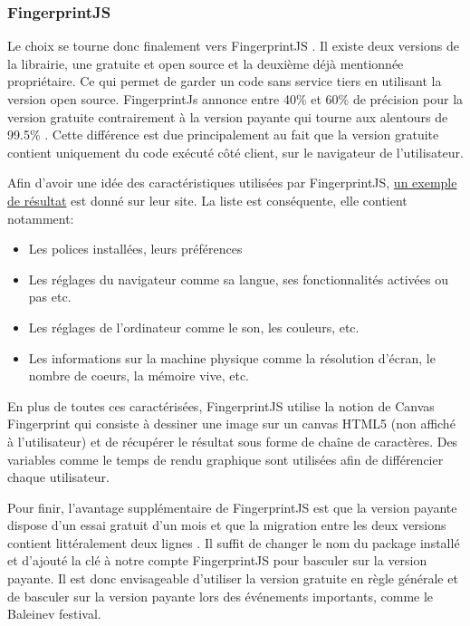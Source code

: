 
\subsubsection{FingerprintJS}
Le choix se tourne donc finalement vers FingerprintJS \cite{fingerprintjs}. Il existe deux versions de la librairie, une gratuite et open source et la deuxième déjà mentionnée propriétaire. Ce qui permet de garder un code sans service tiers en utilisant la version open source. FingerprintJs annonce entre 40\% et 60\% de précision pour la version gratuite contrairement à la version payante qui tourne aux alentours de 99.5\% \cite{fingerprintjsrepo}. Cette différence est due principalement au fait que la version gratuite contient uniquement du code exécuté côté client, sur le navigateur de l'utilisateur.

Afin d'avoir une idée des caractéristiques utilisées par FingerprintJS, \href{https://fingerprintjs.github.io/fingerprintjs}{un exemple de résultat} est donné sur leur site. La liste est conséquente, elle contient notamment:

\begin{itemize}
  \item Les polices installées, leurs préférences
  \item Les réglages du navigateur comme sa langue, ses fonctionnalités activées ou pas etc.
  \item Les réglages de l'ordinateur comme le son, les couleurs, etc.
  \item Les informations sur la machine physique comme la résolution d'écran, le nombre de coeurs, la mémoire vive, etc.
\end{itemize}

En plus de toutes ces caractérisées, FingerprintJS utilise la notion de Canvas Fingerprint qui consiste à dessiner une image sur un canvas HTML5 (non affiché à l'utilisateur) et de récupérer le résultat sous forme de chaîne de caractères. Des variables comme le temps de rendu graphique sont utilisées afin de différencier chaque utilisateur.

Pour finir, l'avantage supplémentaire de FingerprintJS est que la version payante dispose d'un essai gratuit d'un mois et que la migration entre les deux versions contient littéralement deux lignes \cite{migratefingerprintjs}. Il suffit de changer le nom du package installé et d'ajouté la clé à notre compte FingerprintJS pour basculer sur la version payante. Il est donc envisageable d'utiliser la version gratuite en règle générale et de basculer sur la version payante lors des événements importants, comme le Baleinev festival.

